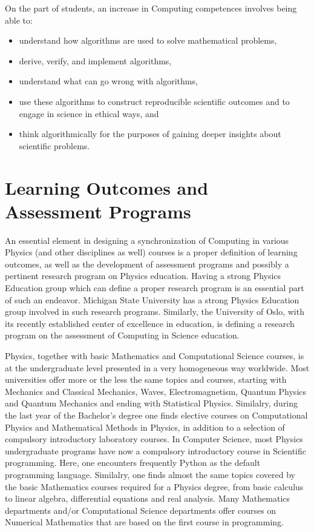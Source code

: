 \documentclass[graybox,envcountchap,sectrefs]{svmult}
\begin{document}
On the part of students, an increase in Computing competences involves being able to:
\begin{itemize}
\item understand how algorithms are used to solve mathematical problems,

\item derive, verify, and implement algorithms,

\item understand what can go wrong with algorithms,

\item use these algorithms to construct reproducible scientific outcomes and to engage in science in ethical ways, and

\item think algorithmically for the purposes of gaining deeper insights about scientific problems.
\end{itemize}


\section{Learning Outcomes and Assessment Programs}

An essential element in designing a synchronization of Computing in
various Physics (and other disciplines as well) courses is a proper
definition of learning outcomes, as well as the development of
assessment programs and possibly a pertinent research program on Physics education. 
Having a strong Physics Education
group which can define a proper research program is an essential part
of such an endeavor. Michigan State University has a strong Physics
Education group involved in such research programs. Similarly, the
University of Oslo, with its recently established center of excellence
in education, is defining a research program on the assessment of
Computing in Science education.

Physics, together with basic Mathematics and Computational Science
courses, is at the undergraduate level presented in a very homogeneous
way worldwide.  Most universities offer more or the less the same
topics and courses, starting with Mechanics and Classical Mechanics,
Waves, Electromagnetism, Quantum Physics and Quantum Mechanics and
ending with Statistical Physics. Similalry, during the last year of
the Bachelor's degree one finds elective courses on Computational
Physics and Mathematical Methods in Physics, in addition to a
selection of compulsory introductory laboratory courses. In Computer
Science, most Physics undergraduate programs have now a compulsory
introductory course in Scientific programming. Here, one encounters
frequently Python as the default programming language.  Similalry, one
finds almost the same topics covered by the basic Mathematics courses
required for a Physics degree, from basic calculus to linear algebra,
differential equations and real analysis. Many Mathematics departments
and/or Computational Science departments offer courses on Numerical
Mathematics that are based on the first course in programming.
\end{document}
